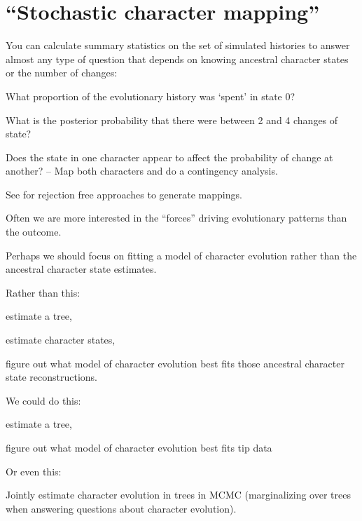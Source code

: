 \documentclass[landscape]{foils}
\begin{document}
\myNewSlide
\section*{``Stochastic character mapping'' }
You can calculate summary statistics on the set of simulated histories to answer almost any type of question that depends on knowing ancestral character states or the number of changes:
\begin{compactitem}
	\item What proportion of the evolutionary history was `spent' in state 0?
	\item What is the posterior probability that there were between 2 and 4 changes of state?
	\item Does the state in one character appear to affect the probability of change at another? -- Map both characters and do a contingency analysis.
\end{compactitem}
	
See \citet{MininS2008MB,MininS2008PRSoc,ObrienMS2009} for rejection free approaches to generate mappings.

\myNewSlide

Often we are more interested in the ``forces'' driving evolutionary patterns than the outcome.

Perhaps we should focus on fitting a model of character evolution rather than the ancestral character state estimates.

\myNewSlide
Rather than this:
\begin{compactenum}
	\item estimate a tree,
	\item estimate character states,
	\item figure out what model of character evolution best fits those ancestral character state reconstructions.
\end{compactenum}

We could do this:
\begin{compactenum}
	\item estimate a tree,
	\item figure out what model of character evolution best fits tip data
\end{compactenum}

Or even this:
\begin{compactenum}
	\item Jointly estimate character evolution in trees in MCMC (marginalizing over trees when answering questions about character evolution).
\end{compactenum}
\end{document}

